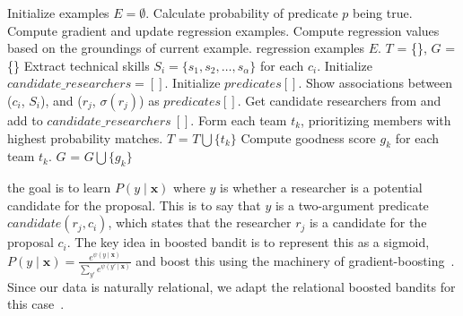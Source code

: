 \begin{algorithm}
{\begin{algorithmic}[1]
        \EndFunction
                \State Initialize examples $E=\emptyset$.
                    \State Calculate probability of predicate $p$ being true.
                    \State Compute gradient and update regression examples.
                    \State Compute regression values based on the groundings of current example.
                \EndFor
            \State \Return regression examples $E$.
            \EndFunction
                \State $T$ = \{\}, $G$ = \{\}     
                \State Extract technical skills $S_i=\{s_1, s_2, \ldots, s_\alpha\}$ for each $c_i$.
                \State Initialize $candidate\_researchers=[]$.
                \State Initialize $predicates[]$.
                \State Show associations between ($c_i$, $S_i$), and ($r_j$, $\sigma(r_j)$) as $predicates[]$.
            \State Get candidate researchers from  and add to $candidate\_researchers~[]$. Form each team $t_k$, prioritizing members with highest probability matches.
            \State $T$ = $T \bigcup  \{t_k\}$ 
            \State Compute goodness score $g_k$ for each team $t_k$. 
            \State $G$ = $G \bigcup  \{g_k\}$ 
        \EndFor
    \end{algorithmic} 
    }
\end{algorithm}  the goal is to learn $P(y\mid\mathbf{x})$ where $y$ is whether a researcher is a potential candidate for the proposal. This is to say that $y$ is a two-argument predicate $candidate(r_j,c_i)$, which states that the researcher $r_j$ is a candidate for the proposal $c_i$. The key idea in boosted bandit is to represent this as a sigmoid, $P(y\mid\mathbf{x}) = \frac{e^{ \psi(y\mid\mathbf{x})}}{\sum_{y' }e^{ \psi(y'\mid\mathbf{x})}}$ and boost this using the machinery of gradient-boosting~\cite{friedman2000additive,dietterich2004training}. Since our data is naturally relational, we adapt the relational boosted bandits for this case~\cite{kakadiya2021relational}.

